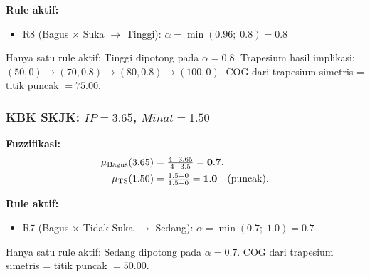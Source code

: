 \documentclass[conference]{IEEEtran}
\begin{document}
\textbf{Rule aktif:}
\begin{itemize}[nosep]
  \item R8 (Bagus $\times$ Suka $\to$ Tinggi):
        $\alpha = \min(0.96;\;0.8) = \mathbf{0.8}$
\end{itemize}

Hanya satu rule aktif: Tinggi dipotong pada $\alpha=0.8$.
Trapesium hasil implikasi: $(50,0)\!\to\!(70,0.8)\!\to\!(80,0.8)\!\to\!(100,0)$.
COG dari trapesium simetris = titik puncak $= \mathbf{75.00}$.

\subsubsection{KBK SKJK: $IP=3.65$, $Minat=1.50$}

\textbf{Fuzzifikasi:}
\begin{align}
  \mu_{\text{Bagus}}(3.65) &= \tfrac{4-3.65}{4-3.5} = \mathbf{0.7}. \notag\\
  \mu_{\text{TS}}(1.50) &= \tfrac{1.5-0}{1.5-0} = \mathbf{1.0}
  \quad\text{(puncak)}. \notag
\end{align}

\textbf{Rule aktif:}
\begin{itemize}[nosep]
  \item R7 (Bagus $\times$ Tidak Suka $\to$ Sedang):
        $\alpha = \min(0.7;\;1.0) = \mathbf{0.7}$
\end{itemize}

Hanya satu rule aktif: Sedang dipotong pada $\alpha=0.7$.
COG dari trapesium simetris = titik puncak $= \mathbf{50.00}$.
\end{document}
